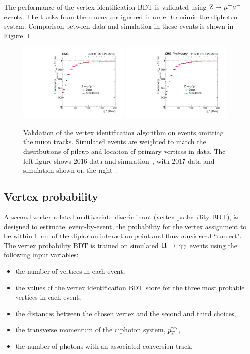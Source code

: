 The performance of the vertex identification BDT is
validated using $\mathrm{Z}\rightarrow{\mu^{+}\mu^{-}}$ events.
The tracks from the muons are ignored in order to mimic the diphoton system.
Comparison between data and simulation in these events is shown in Figure~\ref{fig:obj_VtxId}.

\begin{figure}[h!]
  \centering
  \includegraphics[width=0.49\textwidth]{Figures/Objects/VtxId2016}
  \includegraphics[width=0.49\textwidth]{Figures/Objects/VtxId2017}
  \caption[Vertex identification validation in \Zmumu events.]
  {
    Validation of the \Hgg vertex identification algorithm on \Zmumu events
    omitting the muon tracks. 
    Simulated events are weighted to match the distributions of pileup
    and location of primary vertices in data.
    The left figure shows 2016 data and simulation~\cite{HIG-16-040}, 
    with 2017 data and simulation shown on the right~\cite{HIG-18-029}.
  }
  \label{fig:obj_VtxId}
\end{figure}

\subsection{Vertex probability}

A second vertex-related multivariate discriminant (vertex probability BDT),
is designed to estimate, event-by-event, the probability for the vertex
assignment to be within \SI{1}{cm} of the diphoton interaction point
and thus considered ``correct".
The vertex probability BDT is trained on simulated $\mathrm{H}\,\rightarrow\,\gamma\gamma$ events using
the following input variables:
\begin{itemize}
        \item the number of vertices in each event,
        \item the values of the vertex identification BDT score for
                the three most probable vertices in each event,
        \item the distances between the chosen vertex and the second and
                third choices,
        \item the transverse momentum of the diphoton system, $p_T^{\gamma\gamma}$,
        \item the number of photons with an associated conversion track.
\end{itemize}

